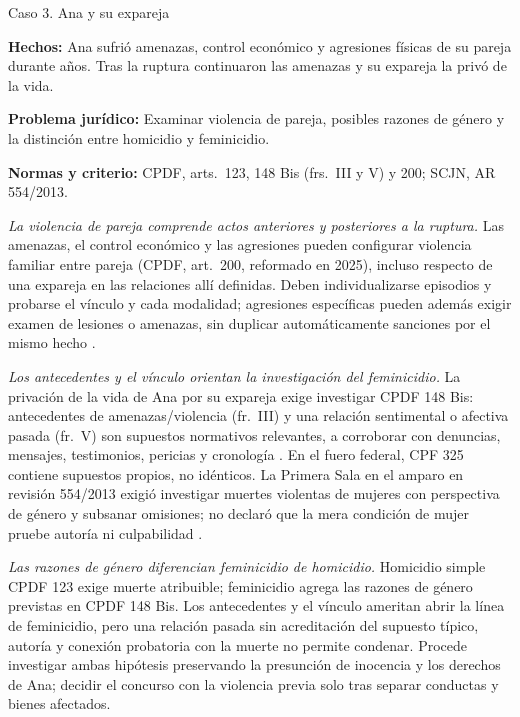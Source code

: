 \documentclass[spanish,letterpaper,oneside]{article}
\newcommand{\fichacaso}[3]{%
	\begin{tcolorbox}[colback=casoverde!5,colframe=casoverde!30,
		boxrule=0.4pt,arc=0.6mm,left=2mm,right=2mm,top=1mm,bottom=1mm]
	\textbf{Hechos:} #1\par
	\textbf{Problema jurídico:} #2\par
	\textbf{Normas y criterio:} #3
	\end{tcolorbox}%
}
\begin{document}
\begin{casoestudio}{Caso 3. Ana y su expareja}
\fichacaso{Ana sufrió amenazas, control económico y agresiones físicas de su pareja durante años. Tras la ruptura continuaron las amenazas y su expareja la privó de la vida.}{Examinar violencia de pareja, posibles razones de género y la distinción entre homicidio y feminicidio.}{CPDF, arts.~123, 148 Bis (frs.~III y V) y 200; SCJN, AR 554/2013.}
\textit{La violencia de pareja comprende actos anteriores y posteriores a la ruptura.} Las amenazas, el control económico y las agresiones pueden configurar violencia familiar entre pareja (CPDF, art.~200, reformado en 2025), incluso respecto de una expareja en las relaciones allí definidas. Deben individualizarse episodios y probarse el vínculo y cada modalidad; agresiones específicas pueden además exigir examen de lesiones o amenazas, sin duplicar automáticamente sanciones por el mismo hecho \citep[art.~200]{cpdfS3Consolidado}.

\textit{Los antecedentes y el vínculo orientan la investigación del feminicidio.} La privación de la vida de Ana por su expareja exige investigar CPDF 148 Bis: antecedentes de amenazas/violencia (fr.~III) y una relación sentimental o afectiva pasada (fr.~V) son supuestos normativos relevantes, a corroborar con denuncias, mensajes, testimonios, pericias y cronología \citep[art.~148 Bis]{cpdfS3Consolidado}. En el fuero federal, CPF 325 contiene supuestos propios, no idénticos. La Primera Sala en el amparo en revisión 554/2013 exigió investigar muertes violentas de mujeres con perspectiva de género y subsanar omisiones; no declaró que la mera condición de mujer pruebe autoría ni culpabilidad \citep{scjnAR5542013}.

\textit{Las razones de género diferencian feminicidio de homicidio.} Homicidio simple CPDF 123 exige muerte atribuible; feminicidio agrega las razones de género previstas en CPDF 148 Bis. Los antecedentes y el vínculo ameritan abrir la línea de feminicidio, pero una relación pasada sin acreditación del supuesto típico, autoría y conexión probatoria con la muerte no permite condenar. Procede investigar ambas hipótesis preservando la presunción de inocencia y los derechos de Ana; decidir el concurso con la violencia previa solo tras separar conductas y bienes afectados.
\end{casoestudio}
\end{document}
